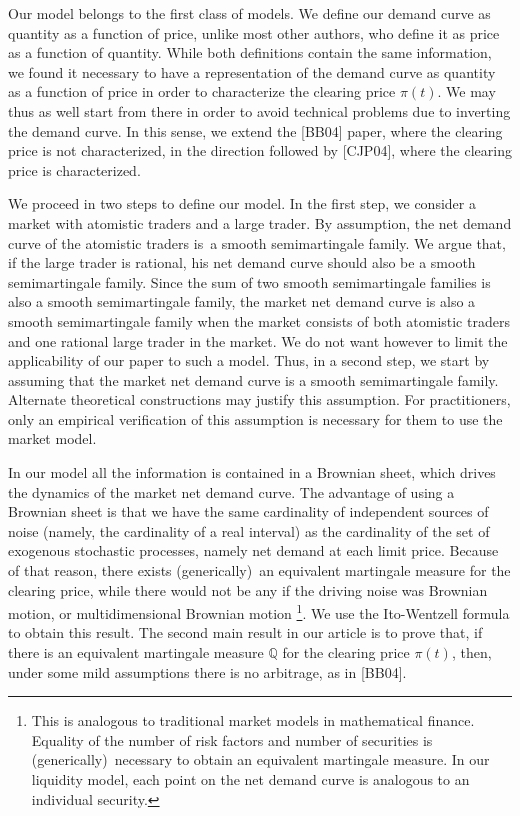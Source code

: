 \documentclass{article}
\begin{document}
Our model belongs to the first class of models. We define our demand curve
as quantity as a function of price, unlike most other authors, who define it
as price as a function of quantity. While both definitions contain the same
information, we found it necessary to have a representation of the demand
curve as quantity as a function of price in order to characterize the
clearing price $\pi (t)$. We may thus as well start from there in order to
avoid technical problems due to inverting the demand curve. In this sense,
we extend the [BB04] paper, where the clearing price is not characterized,
in the direction followed by [CJP04], where the clearing price is
characterized.

We proceed in two steps to define our model. In the first step, we consider
a market with atomistic traders and a large trader. By assumption, the net
demand curve of the atomistic traders is\ a smooth semimartingale family. We
argue that, if the large trader is rational, his net demand curve should
also be a smooth semimartingale family. Since the sum of two smooth
semimartingale families is also a smooth semimartingale family, the market
net demand curve is also a smooth semimartingale family when the market
consists of both atomistic traders and one rational large trader in the
market. We do not want however to limit the applicability of our paper to
such a model. Thus, in a second step, we start by assuming that the market
net demand curve is a smooth semimartingale family. Alternate theoretical
constructions may justify this assumption. For practitioners, only an
empirical verification of this assumption is necessary for them to use the
market model.

In our model all the information is contained in a Brownian sheet, which
drives the dynamics of the market net demand curve. The advantage of using a
Brownian sheet is that we have the same cardinality of independent sources
of noise (namely, the cardinality of a real interval) as the cardinality of
the set of exogenous stochastic processes, namely net demand at each limit
price. Because of that reason, there exists (generically)\ an equivalent
martingale measure for the clearing price, while there would not be any if
the driving noise was Brownian motion, or multidimensional Brownian motion%
\footnote{%
This is analogous to traditional market models in mathematical finance.
Equality of the number of risk factors and number of securities is
(generically)\ necessary to obtain an equivalent martingale measure. In our
liquidity model, each point on the net demand curve is analogous to an
individual security.}. We use the Ito-Wentzell formula to obtain this
result. The second main result in our article is to prove that, if there is
an equivalent martingale measure $\mathbb{Q}$ for the clearing price $\pi
(t) $, then, under some mild assumptions there is no arbitrage, as in [BB04].
\end{document}
